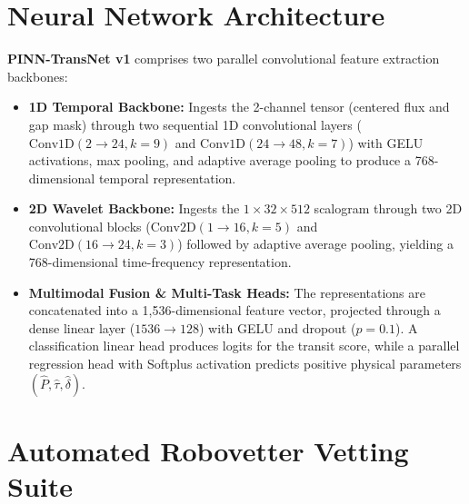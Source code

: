 \documentclass[11pt,a4paper]{article}
\begin{document}
\section{Neural Network Architecture}

\textbf{PINN-TransNet v1} comprises two parallel convolutional feature extraction backbones:
\begin{itemize}
    \item \textbf{1D Temporal Backbone:} Ingests the 2-channel tensor (centered flux and gap mask) through two sequential 1D convolutional layers ($\text{Conv1D}(2 \to 24, k=9)$ and $\text{Conv1D}(24 \to 48, k=7)$) with GELU activations, max pooling, and adaptive average pooling to produce a 768-dimensional temporal representation.
    \item \textbf{2D Wavelet Backbone:} Ingests the $1 \times 32 \times 512$ scalogram through two 2D convolutional blocks ($\text{Conv2D}(1 \to 16, k=5)$ and $\text{Conv2D}(16 \to 24, k=3)$) followed by adaptive average pooling, yielding a 768-dimensional time-frequency representation.
    \item \textbf{Multimodal Fusion \& Multi-Task Heads:} The representations are concatenated into a 1,536-dimensional feature vector, projected through a dense linear layer ($1536 \to 128$) with GELU and dropout ($p=0.1$). A classification linear head produces logits for the transit score, while a parallel regression head with Softplus activation predicts positive physical parameters $(\hat{P}, \hat{\tau}, \hat{\delta})$.
\end{itemize}

\section{Automated Robovetter Vetting Suite}
\end{document}
